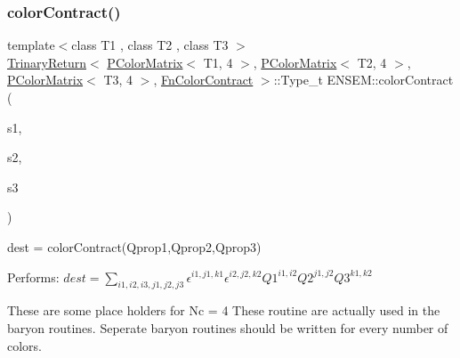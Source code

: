 \subsubsection{\texorpdfstring{colorContract()}{colorContract()}\hspace{0.1cm}{\footnotesize\ttfamily [4/4]}}
{\footnotesize\ttfamily template$<$class T1 , class T2 , class T3 $>$ \\
\mbox{\hyperlink{structENSEM_1_1TrinaryReturn}{Trinary\+Return}}$<$ \mbox{\hyperlink{classENSEM_1_1PColorMatrix}{P\+Color\+Matrix}}$<$ T1, 4 $>$, \mbox{\hyperlink{classENSEM_1_1PColorMatrix}{P\+Color\+Matrix}}$<$ T2, 4 $>$, \mbox{\hyperlink{classENSEM_1_1PColorMatrix}{P\+Color\+Matrix}}$<$ T3, 4 $>$, \mbox{\hyperlink{structENSEM_1_1FnColorContract}{Fn\+Color\+Contract}} $>$\+::Type\+\_\+t E\+N\+S\+E\+M\+::color\+Contract (\begin{DoxyParamCaption}\item[{const \mbox{\hyperlink{classENSEM_1_1PColorMatrix}{P\+Color\+Matrix}}$<$ T1, 4 $>$ \&}]{s1,  }\item[{const \mbox{\hyperlink{classENSEM_1_1PColorMatrix}{P\+Color\+Matrix}}$<$ T2, 4 $>$ \&}]{s2,  }\item[{const \mbox{\hyperlink{classENSEM_1_1PColorMatrix}{P\+Color\+Matrix}}$<$ T3, 4 $>$ \&}]{s3 }\end{DoxyParamCaption})\hspace{0.3cm}{\ttfamily [inline]}}



dest = color\+Contract(\+Qprop1,\+Qprop2,\+Qprop3) 

Performs\+: $dest = \sum_{i1,i2,i3,j1,j2,j3} \epsilon^{i1,j1,k1}\epsilon^{i2,j2,k2} Q1^{i1,i2} Q2^{j1,j2} Q3^{k1,k2}$

These are some place holders for Nc = 4 These routine are actually used in the baryon routines. Seperate baryon routines should be written for every number of colors. \mbox{\label{group__primcolormatrix_ga4f0b21163125568ab5bcbbef75a17973}} 
